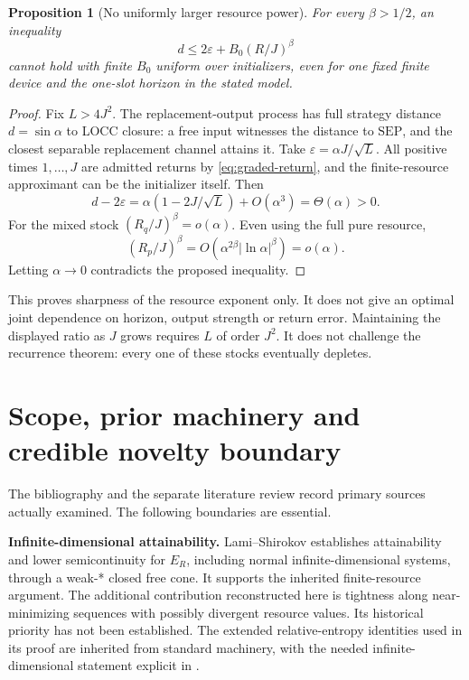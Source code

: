 \documentclass[11pt,a4paper]{article}
\numberwithin{equation}{section}
\newtheorem{proposition}[theorem]{Proposition}
\theoremstyle{remark}
\newcommand{\SEP}{\mathrm{SEP}}
\newcommand{\ER}{E_R}
\begin{document}
\begin{proposition}[No uniformly larger resource power]
For every \(\beta>1/2\), an inequality
\[
 d\leq2\varepsilon+B_0(R/J)^\beta
\]
cannot hold with finite \(B_0\) uniform over initializers, even for one
fixed finite device and the one-slot horizon in the stated model.
\end{proposition}
\begin{proof}
Fix \(L>4J^2\). The replacement-output process has full strategy distance
\(d=\sin\alpha\) to LOCC closure: a free input witnesses the distance to
\(\SEP\), and the closest separable replacement channel attains it.
Take \(\varepsilon=\alpha J/\sqrt L\). All positive times \(1,\ldots,J\)
are admitted returns by \eqref{eq:graded-return}, and the finite-resource
approximant can be the initializer itself. Then
\[
 d-2\varepsilon
   =\alpha(1-2J/\sqrt L)+O(\alpha^3)=\Theta(\alpha)>0.
\]
For the mixed stock \((R_q/J)^\beta=o(\alpha)\).
Even using the full pure resource,
\[
 (R_p/J)^\beta=O(\alpha^{2\beta}|\ln\alpha|^\beta)=o(\alpha).
\]
Letting \(\alpha\to0\) contradicts the proposed inequality.
\end{proof}
This proves sharpness of the resource exponent only. It does not give an
optimal joint dependence on horizon, output strength or return error.
Maintaining the displayed ratio as \(J\) grows requires \(L\) of order
\(J^2\). It does not challenge the recurrence theorem: every one of these
stocks eventually depletes.

\section{Scope, prior machinery and credible novelty boundary}
\label{sec:priority}
The bibliography and the separate literature review record primary
sources actually examined. The following boundaries are essential.

\textbf{Infinite-dimensional attainability.}
Lami--Shirokov \cite{LS} establishes attainability and lower
semicontinuity for \(\ER\), including normal infinite-dimensional
systems, through a weak-* closed free cone. It supports the inherited
finite-resource argument. The additional contribution reconstructed here
is tightness along near-minimizing sequences with possibly divergent
resource values. Its historical priority has not been established.
The extended relative-entropy identities used in its proof are inherited
from standard machinery, with the needed infinite-dimensional statement
explicit in \cite{Shirokov}.
\end{document}
